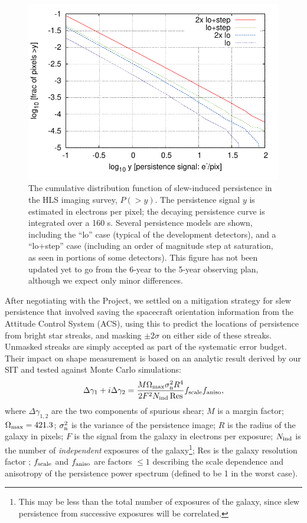\begin{figure}
\includegraphics[width=5in]{Plots/sp_cdf.pdf}
\caption{\label{fig:sp_cdf}The cumulative distribution function of slew-induced persistence in the HLS imaging survey, $P(>y)$.
The persistence signal $y$ is estimated in electrons per pixel; the decaying persistence curve is integrated over a 160 s. Several persistence models are shown, including the ``lo'' case (typical of the development detectors), and a ``lo+step'' case (including an order of magnitude step at saturation, as seen in portions of some detectors). This figure has not been updated yet to go from the 6-year to the 5-year observing plan, although we expect only minor differences.}
\end{figure}

After negotiating with the Project, we settled on a mitigation strategy for slew persistence that involved saving the spacecraft orientation information from the Attitude Control System (ACS), using this to predict the locations of persistence from bright star streaks, and masking $\pm2\sigma$ on either side of these streaks. Unmasked streaks are simply accepted as part of the systematic error budget. Their impact on shape measurement is based on an analytic result derived by our SIT and tested against Monte Carlo simulations:
\begin{equation}
\Delta \gamma_1 + i\Delta \gamma_2 = \frac{M\Omega_{\rm
max}\sigma_{\rm n}^2 R^4}{2F^2N_{\rm ind}\,{\rm Res}} f_{\rm scale}
f_{\rm aniso},
\label{eq:dg}
\end{equation}
where $\Delta\gamma_{1,2}$ are the two components of spurious shear; $M$ is a margin factor; $\Omega_{\rm max} = 421.3$; $\sigma_{\rm n}^2$ is the variance of the persistence image; $R$ is the radius of the galaxy in pixels; $F$ is the signal from the galaxy in electrons per exposure; $N_{\rm ind}$ is the number of {\em independent} exposures of the galaxy\footnote{This may be less than the total number of exposures of the galaxy, since slew persistence from successive exposures will be correlated.}; Res is the galaxy resolution factor \cite{bej02}; $f_{\rm scale}$ and $f_{\rm aniso}$ are factors $\le 1$ describing the scale dependence and anisotropy of the persistence power spectrum (defined to be 1 in the worst case).

